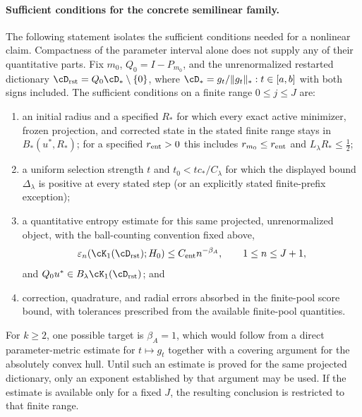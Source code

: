 \documentclass[11pt]{article}
\theoremstyle{remark}
\begin{document}
\paragraph{Sufficient conditions for the concrete semilinear family.}
The following statement isolates the sufficient conditions needed for a
nonlinear claim. Compactness of the parameter interval alone does not supply any of
their quantitative parts. Fix $m_0$, $Q_0=I-P_{m_0}$, and the unrenormalized restarted
dictionary $\cD_{\rm rst}=Q_0\cD_*\setminus\{0\}$, where
$\cD_*={g_t/\|g_t\|_*:t\in[a,b]}$ with both signs included.  The sufficient conditions on a finite range $0\leq j\leq J$ are:
\begin{enumerate}[label=(A\arabic*)]
  \item an initial radius and a specified $R_*$ for which every exact active
  minimizer, frozen projection, and corrected state in the stated finite range stays in
  $B_*(u^*,R_*)$; for a specified $r_{\rm ent}>0$ this includes
  $r_{m_0}\leq r_{\rm ent}$ and
  $L_\lambda R_*\leq\tfrac12$;
  \item a uniform selection strength $t$ and $t_0<tc_*/C_\lambda$ for
  which the displayed bound $\Delta_\lambda$ is positive at every
  stated step (or an explicitly stated finite-prefix exception);
  \item a quantitative entropy estimate for this same projected,
  unrenormalized object, with the ball-counting convention fixed above,
  \begin{equation}
    \varepsilon_n\!\left(\cK_1(\cD_{\rm rst});H_0\right)
       \leq C_{\rm ent}n^{-\beta_A},
       \qquad 1\leq n\leq J+1,
    \label{eq:c5-family-entropy-certificate}
  \end{equation}
  and $Q_0u^*\in B_\lambda\cK_1(\cD_{\rm rst})$; and
  \item correction, quadrature, and radial errors absorbed in the
  finite-pool score bound, with tolerances prescribed from the available finite-pool quantities.
\end{enumerate}
For $k\geq2$, one possible target is $\beta_A=1$, which would follow from a direct
parameter-metric estimate for $t\mapsto g_t$ together with a covering argument for the
absolutely convex hull. Until such an estimate is proved for the same projected dictionary,
only an exponent established by that argument may be used. If the estimate is available only
for a fixed $J$, the resulting conclusion is restricted to that finite range.
\end{document}
